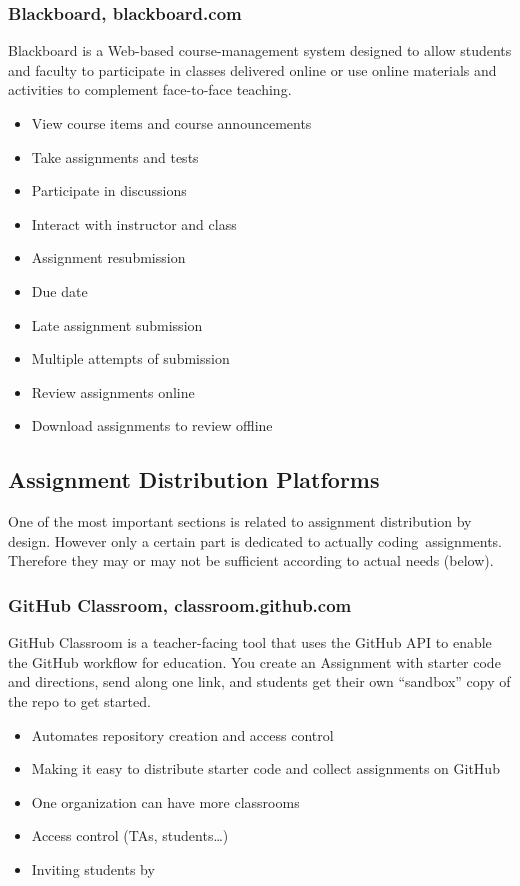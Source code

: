 \subsubsection{Blackboard, blackboard.com}

{Blackboard is a Web-based course-management system designed to allow students and faculty to participate in classes delivered online or use online materials and activities to complement face-to-face teaching.}

\begin{itemize}
\item
  {View course items and course announcements}
\item
  {Take assignments and tests}
\item
  {Participate in discussions}
\item
  {Interact with instructor and class}
\item
  {Assignment resubmission}
\item
  {Due date}
\item
  {Late assignment submission}
\item
  {Multiple attempts of submission}
\item
  {Review assignments online}
\item
  {Download assignments to review offline}
\end{itemize}

\subsection{Assignment Distribution Platforms} \label{ssec:adp}

{One of the most important sections is related to assignment distribution by design. }{However only a certain part is dedicated to actually }{coding}{~assignments. Therefore they may or may not be sufficient according to actual needs (below).}

\subsubsection{GitHub Classroom, classroom.github.com}

{GitHub Classroom is a teacher-facing tool that uses the GitHub API to enable the GitHub workflow for education. You create an Assignment with starter code and directions, send along one link, and students get their own ``sandbox'' copy of the repo to get started.}

\begin{itemize}
\item
  {Automates repository creation and access control}
\item
  {Making it easy to distribute starter code and collect assignments on GitHub}
\item
  {One organization can have more classrooms}
\item
  {Access control (TAs, students\ldots{})}
\item
  {Inviting students by}
\end{itemize}

